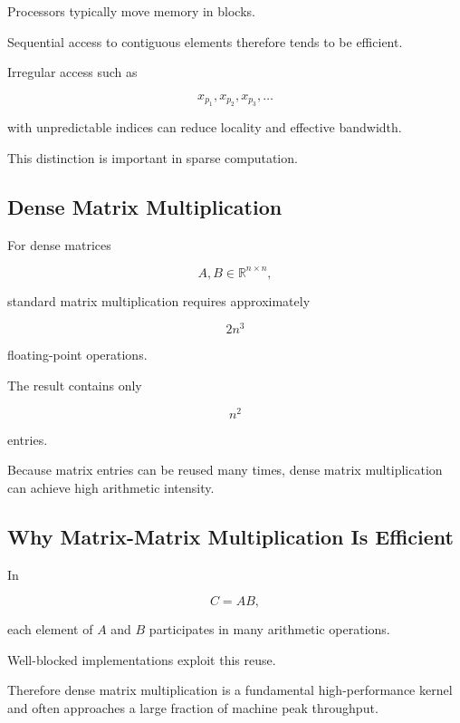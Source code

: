 Processors typically move memory in blocks.

Sequential access to contiguous elements therefore tends to be efficient.

Irregular access such as

\[
x_{p_1},
x_{p_2},
x_{p_3},
\ldots
\]

with unpredictable indices can reduce locality and effective bandwidth.

This distinction is important in sparse computation.

\subsection{Dense Matrix Multiplication}
\label{subsec:hpmc-dense-matrix-multiplication}

For dense matrices

\[
A,B\in\mathbb{R}^{n\times n},
\]

standard matrix multiplication requires approximately

\[
\boxed{
2n^3
}
\]

floating-point operations.

The result contains only

\[
n^2
\]

entries.

Because matrix entries can be reused many times, dense matrix
multiplication can achieve high arithmetic intensity.

\subsection{Why Matrix-Matrix Multiplication Is Efficient}
\label{subsec:why-gemm-efficient}

In

\[
C=AB,
\]

each element of \(A\) and \(B\) participates in many arithmetic operations.

Well-blocked implementations exploit this reuse.

Therefore dense matrix multiplication is a fundamental high-performance
kernel and often approaches a large fraction of machine peak throughput.

